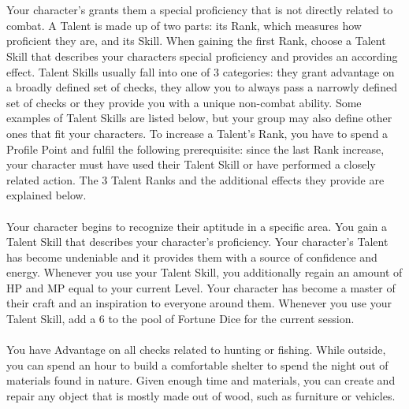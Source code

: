 \documentclass[a4paper, titlepage, 11pt, twocolumn] {article}
\begin{document}
%
%
\clearpage
%
%
%
\\\\
%
Your character's  grants them a special proficiency that is not directly related to combat.
A Talent is made up of two parts: its Rank, which measures how proficient they are, and its Skill.
When gaining the first Rank, choose a Talent Skill that describes your characters special proficiency and provides an according effect.
Talent Skills usually fall into one of 3 categories: they grant advantage on a broadly defined set of checks, they allow you to always pass a narrowly defined set of checks or they provide you with a unique non-combat ability.
Some examples of Talent Skills are listed below, but your group may also define other ones that fit your characters.
To increase a Talent's Rank, you have to spend a Profile Point and fulfil the following prerequisite: since the last Rank increase, your character must have used their Talent Skill or have performed a closely related action.
The 3 Talent Ranks and the additional effects they provide are explained below.
%
\\\\
%
 Your character begins to recognize their aptitude in a specific area. You gain a Talent Skill that describes your character's proficiency. \ofrow
{} Your character's Talent has become undeniable and it provides them with a source of confidence and energy. Whenever you use your Talent Skill, you additionally regain an amount of HP and MP equal to your current Level. \ofrow
{} Your character has become a master of their craft and an inspiration to everyone around them. Whenever you use your Talent Skill, add a 6 to the pool of Fortune Dice for the current session.
%
\vfill
%
\\\\
%
{You have Advantage on all checks related to hunting or fishing.}
\ofrow
{}
{While outside, you can spend an hour to build a comfortable shelter to spend the night out of materials found in nature.}	
\ofrow
{}
{Given enough time and materials, you can create and repair any object that is mostly made out of wood, such as furniture or vehicles.}
\ofrow
{}
\ofrow
\end{document}
